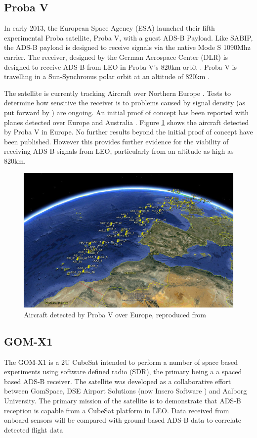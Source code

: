 \subsection{Proba V}
In early 2013, the European Space Agency (ESA) launched their fifth experimental Proba satellite, Proba V, with a guest ADS-B Payload. Like SABIP, the ADS-B payload is designed to receive signals via the native Mode S 1090Mhz carrier. The receiver, designed by the German Aerospace Center (DLR) is designed to receive ADS-B from LEO in Proba V's 820km orbit \cite{DLR,TheEur,T}. Proba V is travelling in a Sun-Synchronus polar orbit at an altitude of 820km \cite{TheEur}.  

The satellite is currently tracking Aircraft over Northern Europe \cite{DLR}. Tests to determine how sensitive the receiver is to problems caused by signal density (as put forward by \cite{Blomenhofer2012}) are ongoing. An initial proof of concept has been reported with planes detected over Europe and Australia \cite{TheEur}. Figure \ref{fig:probav_planes} shows the aircraft detected by Proba V in Europe. No further results beyond the initial proof of concept have been published. However this provides further evidence for the viability of receiving ADS-B signals from LEO, particularly from an altitude as high as 820km.
\begin{figure}[H]
	\centering
	\includegraphics[scale = 0.5]{Pictures/probav_planes.jpg}
	
	\caption[Aircraft detected by Proba V over Europe]{Aircraft detected by Proba V over Europe, reproduced from \cite{TheEur}}
	\label{fig:probav_planes}
\end{figure}

\subsection{GOM-X1}
The GOM-X1 is a 2U CubeSat intended to perform a number of space based experiments using software defined radio (SDR), the primary being a a spaced based ADS-B receiver. The satellite was developed as a collaborative effort between GomSpace, DSE Airport Solutions (now Insero Software \cite{Insero2014}) and Aalborg University. The primary mission of the satellite is to demonstrate that ADS-B reception is capable from a CubeSat platform in LEO. Data received from onboard sensors will be compared with ground-based ADS-B data to correlate detected flight data \cite{GomSpace2014,Alminde2012}

